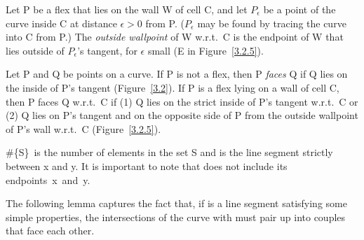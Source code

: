 
Let P be a flex that lies on the wall W of cell C, and 
let $P_{\epsilon}$ be a point of the curve inside C at distance
$\epsilon > 0$ from P.
($P_{\epsilon}$ may be found by tracing the curve into C from P.)
The {\em outside wallpoint} of W w.r.t.\ C is the endpoint of W that 
lies outside of $P_{\epsilon}$'s tangent, for $\epsilon$ small (E in Figure~\ref{3.2.5}).

Let P and Q be points on a curve.
If P is not a flex, then P {\em faces} Q if Q lies on the inside of 
P's tangent (Figure~\ref{3.2}).
If P is a flex lying on a wall of cell C, then
P faces Q w.r.t.\ C if (1) Q lies on the strict inside of P's tangent 
w.r.t.\ C or (2) Q lies on P's tangent and on the opposite side of P from 
the outside wallpoint of P's wall w.r.t.\ C (Figure~\ref{3.2.5}).

\begin{notation}
\#\{S\}\ is the number of elements in the set S and
 is the line segment strictly between x and y.
It is important to note that 
 does not include its \mbox{endpoints x and y}.
\end{notation}

The following lemma captures the fact that, if \seg{\x\y} is a line segment 
satisfying some simple properties, the intersections of the curve with 
\seg{\x\y} must pair up into couples that face each other.

